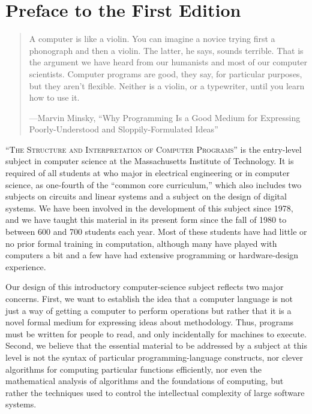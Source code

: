 \chapter*{Preface to the First Edition}
\label{Preface 1e}

\begin{quote}
A computer is like a violin.  You can imagine a novice trying first a
phonograph and then a violin.  The latter, he says, sounds terrible.  That is
the argument we have heard from our humanists and most of our computer
scientists.  Computer programs are good, they say, for particular purposes, but
they aren't flexible.  Neither is a violin, or a typewriter, until you learn
how to use it.

---Marvin Minsky, ``Why Programming Is a Good Medium for Expressing
Poorly-Understood and Sloppily-Formulated Ideas''
\end{quote}


\noindent
\lettrine[lhang=0.17]{``T}{he Structure and Interpretation of Computer Programs''} is the entry-level
subject in computer science at the Massachusetts Institute of Technology.  It
is required of all students at  who major in electrical
engineering or in computer science, as one-fourth of the ``common core
curriculum,'' which also includes two subjects on circuits and linear systems
and a subject on the design of digital systems.  We have been involved in the
development of this subject since 1978, and we have taught this material in its
present form since the fall of 1980 to between 600 and 700 students each year.
Most of these students have had little or no prior formal training in
computation, although many have played with computers a bit and a few have had
extensive programming or hardware-design experience.

Our design of this introductory computer-science subject reflects two major
concerns.  First, we want to establish the idea that a computer language is not
just a way of getting a computer to perform operations but rather that it is a
novel formal medium for expressing ideas about methodology.  Thus, programs
must be written for people to read, and only incidentally for machines to
execute.  Second, we believe that the essential material to be addressed by a
subject at this level is not the syntax of particular programming-language
constructs, nor clever algorithms for computing particular functions
efficiently, nor even the mathematical analysis of algorithms and the
foundations of computing, but rather the techniques used to control the
intellectual complexity of large software systems.

